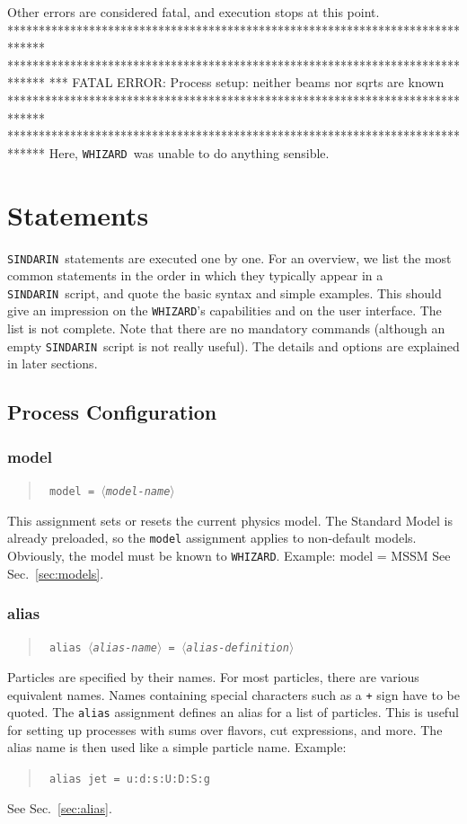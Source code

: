 \documentclass[12pt]{book}
\newenvironment{interaction}%
  {\begingroup\small
   \verbatim}%
  {\endverbatim
   \endgroup\noindent}
\newenvironment{code}%
  {\begingroup\footnotesize
   \quote
   \verbatim}%
  {\endverbatim
   \endquote
   \endgroup\noindent}
\newenvironment{syntax}%
  {\begin{quote}
   \begin{flushleft}\tt}%
  {\end{flushleft}
   \end{quote}}
\newcommand{\var}[1]{$\langle$\textit{#1}$\rangle$}
\newcommand{\ttt}[1]{\texttt{#1}}
\newcommand{\whizard}{\texttt{WHIZARD}}
\newcommand{\sindarin}{\texttt{SINDARIN}}
\begin{document}
Other errors are considered fatal, and execution stops at this point.
\begin{interaction}
******************************************************************************
******************************************************************************
*** FATAL ERROR: Process setup: neither beams nor sqrts are known
******************************************************************************
******************************************************************************
\end{interaction}
Here, \whizard\ was unable to do anything sensible.


\section{Statements}

\sindarin\ statements are executed one by one.  For an overview, we
list the most common statements in the order in which they typically
appear in a \sindarin\ script, and quote the basic syntax and simple
examples.  This should give an impression on the \whizard's
capabilities and on the user interface.  The list is not complete.
Note that there are no
mandatory commands (although an empty \sindarin\ script is not really
useful).  The details and options are explained in later sections.

\subsection{Process Configuration}

\subsubsection{model}
\begin{syntax}
model = \var{model-name}
\end{syntax}
This assignment sets or resets the current physics model.  The
Standard Model is already preloaded, so the \ttt{model} assignment
applies to non-default models.  Obviously, the model must be known to
\whizard. Example:
\begin{code}
model = MSSM
\end{code}
See Sec.~\ref{sec:models}.

\subsubsection{alias}
\begin{syntax}
alias \var{alias-name} = \var{alias-definition}
\end{syntax}
Particles are specified by their names.   For most particles, there
are various equivalent names.  Names containing special characters
such as a \verb|+| sign have to be quoted.  The \ttt{alias} assignment
defines an alias for a list of particles.  This is useful for setting
up processes with sums over flavors, cut expressions, and more.  The
alias name is then used like a simple particle name.  Example:
\begin{syntax}
alias jet = u:d:s:U:D:S:g
\end{syntax}
See Sec.~\ref{sec:alias}.
\end{document}
